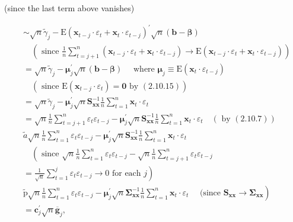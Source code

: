 \documentclass[10pt]{article}
\begin{document}
(since the last term above vanishes)

$$
\begin{aligned}
& \sim \sqrt{n} \tilde{\gamma}_{j}-\mathrm{E}\left(\mathbf{x}_{t-j} \cdot \varepsilon_{t}+\mathbf{x}_{t} \cdot \varepsilon_{t-j}\right)^{\prime} \sqrt{n}(\mathbf{b}-\boldsymbol{\beta}) \\
& \quad\left(\text { since } \frac{1}{n} \sum_{t=j+1}^{n}\left(\mathbf{x}_{t-j} \cdot \varepsilon_{t}+\mathbf{x}_{t} \cdot \varepsilon_{t-j}\right) \rightarrow \mathrm{E}\left(\mathbf{x}_{t-j} \cdot \varepsilon_{t}+\mathbf{x}_{t} \cdot \varepsilon_{t-j}\right)\right) \\
&= \sqrt{n} \tilde{\gamma}_{j}-\boldsymbol{\mu}_{j}^{\prime} \sqrt{n}(\mathbf{b}-\boldsymbol{\beta}) \quad \text { where } \boldsymbol{\mu}_{j} \equiv \mathrm{E}\left(\mathbf{x}_{t} \cdot \varepsilon_{t-j}\right) \\
& \quad\left(\text { since } \mathrm{E}\left(\mathbf{x}_{t-j} \cdot \varepsilon_{t}\right)=\mathbf{0} \text { by }(2.10 .15)\right) \\
&= \sqrt{n} \tilde{\gamma}_{j}-\boldsymbol{\mu}_{j}^{\prime} \sqrt{n} \mathbf{S}_{\mathbf{x x}}^{-1} \frac{1}{n} \sum_{t=1}^{n} \mathbf{x}_{t} \cdot \varepsilon_{t} \\
&= \sqrt{n} \frac{1}{n} \sum_{t=j+1}^{n} \varepsilon_{t} \varepsilon_{t-j}-\boldsymbol{\mu}_{j}^{\prime} \sqrt{n} \mathbf{S}_{\mathbf{x x}}^{-1} \frac{1}{n} \sum_{t=1}^{n} \mathbf{x}_{t} \cdot \varepsilon_{t} \quad(\text { by }(2.10 .7)) \\
& \widetilde{a} \sqrt{n} \frac{1}{n} \sum_{t=1}^{n} \varepsilon_{t} \varepsilon_{t-j}-\boldsymbol{\mu}_{j}^{\prime} \sqrt{n} \mathbf{S}_{\mathbf{x x}}^{-1} \frac{1}{n} \sum_{t=1}^{n} \mathbf{x}_{t} \cdot \varepsilon_{t} \\
& \quad\left(\text { since } \sqrt{n} \frac{1}{n} \sum_{t=1}^{n} \varepsilon_{t} \varepsilon_{t-j}-\sqrt{n} \frac{1}{n} \sum_{t=j+1}^{n} \varepsilon_{t} \varepsilon_{t-j}\right. \\
&\left.=\frac{1}{\sqrt{n}} \sum_{t=1}^{j} \varepsilon_{t} \varepsilon_{t-j} \rightarrow 0 \text { for each } j\right) \\
&\left.\widetilde{\mathrm{p}} \sqrt{n} \frac{1}{n} \sum_{t=1}^{n} \varepsilon_{t} \varepsilon_{t-j}-\boldsymbol{\mu}_{j}^{\prime} \sqrt{n} \mathbf{\Sigma}_{\mathbf{x x}}^{-1} \frac{1}{n} \sum_{t=1}^{n} \mathbf{x}_{t} \cdot \varepsilon_{t} \quad \text { (since } \mathbf{S}_{\mathbf{x x}} \rightarrow \mathbf{\Sigma}_{\mathbf{x x}}\right) \\
&=\mathbf{c}_{j}^{\prime} \sqrt{n} \overline{\mathbf{g}}_{j},
\end{aligned}
$$
\end{document}
